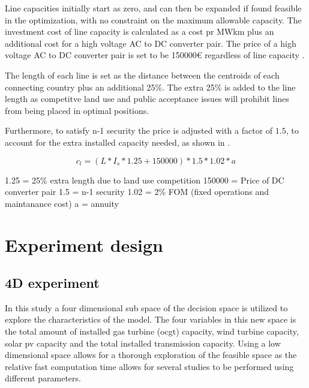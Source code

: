 Line capacities initially start as zero, and can then be expanded if found feasible in the optimization, with no constraint on the maximum allowable capacity. The investment cost of line capacity is calculated as a cost pr MWkm plus an additional cost for a high voltage AC to DC converter pair. The price of a high voltage AC to DC converter pair is set to be 150000€ regardless of line capacity \cite{HAGSPIEL2014654}. 

The length of each line is set as the distance between the centroids of each connecting country plus an additional 25\%. The extra 25\% is added to the line length as competitve land use and public acceptance issues will prohibit lines from being placed in optimal positions. 

Furthermore, to satisfy n-1 security the price is adjusted with a factor of $1.5$, to account for the extra installed capacity needed, as shown in \cite{PyPSA_euro_30_model}. 

\begin{equation}
c_l = \left( L*I_s*1.25+150000 \right) *1.5*1.02*a
\end{equation}

1.25 = 25\% extra length due to land use competition
150000 = Price of DC converter pair
1.5 = n-1 security 
1.02 = 2\% FOM (fixed operations and maintanance cost)
a = annuity 











\section{Experiment design}


\subsection{4D experiment}
In this study a four dimensional sub space of the decision space is utilized to explore the characteristics of the model. The four variables in this new space is the total amount of installed gas turbine (ocgt) capacity, wind turbine capacity, solar pv capacity and the total installed transmission capacity. Using a low dimensional space allows for a thorough exploration of the feasible space as the relative fast computation time allows for several studies to be performed using different parameters. 

